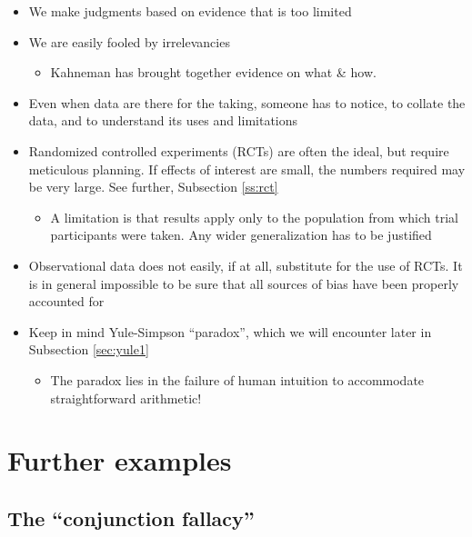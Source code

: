 \documentclass[
  10ptls,
  b5paper]{book}
\providecommand{\tightlist}{%
  \setlength{\itemsep}{0pt}\setlength{\parskip}{0pt}}
\begin{document}
\begin{itemize}
\tightlist
\item
  We make judgments based on evidence that is too limited
\item
  We are easily fooled by irrelevancies

  \begin{itemize}
  \tightlist
  \item
    Kahneman has brought together evidence on what \& how.
  \end{itemize}
\item
  Even when data are there for the taking, someone has to notice, to collate the data, and to understand its uses and limitations
\item
  Randomized controlled experiments (RCTs) are often the ideal, but require meticulous planning. If effects of interest are small, the numbers required may be very large. See further, Subsection \ref{ss:rct}

  \begin{itemize}
  \tightlist
  \item
    A limitation is that results apply only to the population from which
    trial participants were taken. Any wider generalization has to be justified
  \end{itemize}
\item
  Observational data does not easily, if at all, substitute for the use of
  RCTs. It is in general impossible to be sure that all sources of bias have
  been properly accounted for
\item
  Keep in mind Yule-Simpson ``paradox'', which we will encounter later in Subsection \ref{sec:yule1}

  \begin{itemize}
  \tightlist
  \item
    The paradox lies in the failure of human intuition to accommodate straightforward arithmetic!
  \end{itemize}
\end{itemize}

\section{Further examples}\label{further-examples}

\subsection*{The ``conjunction fallacy''}\label{the-conjunction-fallacy}
\end{document}
